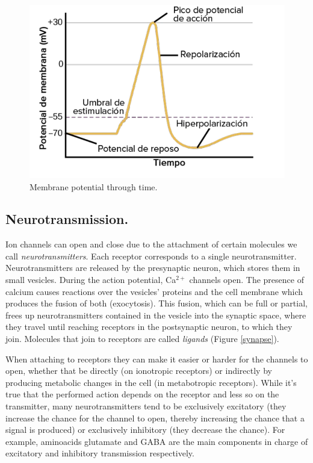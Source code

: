 \begin{figure}[H]
	\centering
	\includegraphics[width=\linewidth]{media/6-potencialgraph.png}
	\caption{Membrane potential through time.}
	\label{actiongraph}
\end{figure}

\subsection{Neurotransmission.}

Ion channels can open and close due to the attachment of certain molecules we call \textit{neurotransmitters}. Each receptor corresponds to a single neurotransmitter. Neurotransmitters are released by the presynaptic neuron, which stores them in small vesicles. During the action potential, Ca$^{2+}$ channels open. The presence of calcium causes reactions over the vesicles' proteins and the cell membrane which produces the fusion of both (exocytosis). This fusion, which can be full or partial, frees up neurotransmitters contained in the vesicle into the synaptic space, where they travel until reaching receptors in the postsynaptic neuron, to which they join. Molecules that join to receptors are called \textit{ligands} (Figure \ref{synapse}).

When attaching to receptors they can make it easier or harder for the channels to open, whether that be directly (on ionotropic receptors) or indirectly by producing metabolic changes in the cell (in metabotropic receptors). While it's true that the performed action depends on the receptor and less so on the transmitter, many neurotransmitters tend to be exclusively excitatory (they increase the chance for the channel to open, thereby increasing the chance that a signal is produced) or exclusively inhibitory (they decrease the chance). For example, aminoacids glutamate and GABA are the main components in charge of excitatory and inhibitory transmission respectively.

